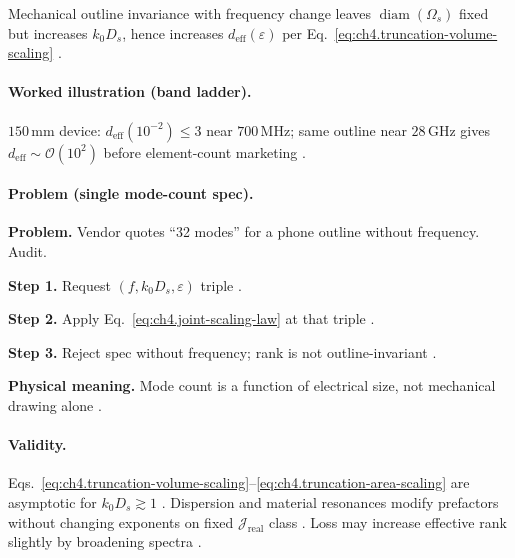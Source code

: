 \begin{corollary}
\label{cor:ch4.outline-rank-noninvariant}
Mechanical outline invariance with frequency change leaves \(\operatorname{diam}(\Omega_{s})\) fixed but increases \(k_{0}D_{s}\), hence
increases \(d_{\mathrm{eff}}(\varepsilon)\) per Eq.~\eqref{eq:ch4.truncation-volume-scaling} \cite{jackson1999,harrington2001,stratton1941}.
\end{corollary}

\paragraph{Worked illustration (band ladder).}
\(150\,\mathrm{mm}\) device: \(d_{\mathrm{eff}}(10^{-2})\le3\) near \(700\,\mathrm{MHz}\); same outline near \(28\,\mathrm{GHz}\) gives
\(d_{\mathrm{eff}}\sim\mathcal{O}(10^{2})\) before element-count marketing \cite{harrington2001,collin2001,hansen1988,jackson1999}.

\paragraph{Problem (single mode-count spec).}
\textbf{Problem.} Vendor quotes ``32 modes'' for a phone outline without frequency. Audit.

\textbf{Step 1.} Request \((f,k_{0}D_{s},\varepsilon)\) triple \cite{jackson1999,hansen1988}.

\textbf{Step 2.} Apply Eq.~\eqref{eq:ch4.joint-scaling-law} at that triple \cite{harrington2001}.

\textbf{Step 3.} Reject spec without frequency; rank is not outline-invariant \cite{stratton1941,devaney2004}.

\textbf{Physical meaning.} Mode count is a function of electrical size, not mechanical drawing alone \cite{hansen1988}.

\paragraph{Validity.}
Eqs.~\eqref{eq:ch4.truncation-volume-scaling}--\eqref{eq:ch4.truncation-area-scaling} are asymptotic for \(k_{0}D_{s}\gtrsim1\)
\cite{jackson1999,hansen1988}. Dispersion and material resonances modify prefactors without changing exponents on fixed \(\mathcal{J}_{\mathrm{real}}\)
class \cite{stratton1941,harrington2001}. Loss may increase effective rank slightly by broadening spectra \cite{devaney2004}.

